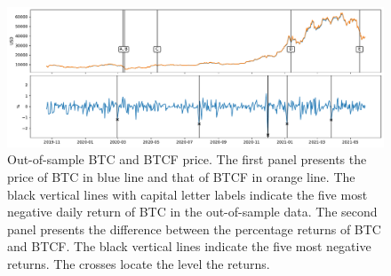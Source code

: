 \begin{figure}[t]
\includegraphics[width=\textwidth]{_pics/BTC_price.pdf}
  \caption{Out-of-sample BTC and BTCF price. The first panel presents the price of BTC in blue line and that of BTCF in orange line.
  The black vertical lines with capital letter labels indicate the five most negative daily return of BTC in the out-of-sample data.
  The second panel presents the difference between the percentage returns of BTC and BTCF.
  The black vertical lines indicate the five most negative returns.
  The crosses locate the level the returns.}
\label{fig:BTC_price}
\end{figure}


